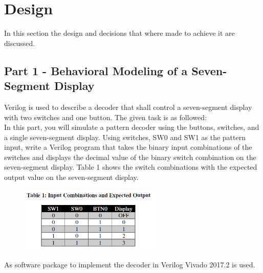 \section{Design}\label{sec: Design}
In this section the design and decisions that where made to achieve it are discussed.

\subsection{Part 1 - Behavioral Modeling of a Seven-Segment Display}\label{sub: Behavioral Modeling of a Seven-Segment Display}
Verilog is used to describe a decoder that shall control a seven-segment display with two switches and one button. The given task is as followed:
\\
In this part, you will simulate a pattern decoder using the buttons, switches, and a single seven-segment display.
Using switches, SW0 and SW1 as the pattern input, write a Verilog program that takes the binary input
combinations of the switches and displays the decimal value of the binary switch combination on the seven-segment
display. Table 1 shows the switch combinations with the expected output value on the seven-segment
display.

\begin{figure}[htbp]
	\centering
	\includegraphics[width=0.6\textwidth]{01_images/Vivado_lab2_part1_table1.png}
	\label{fig: Vivado_lab2_part1_table1}
\end{figure}

As software package to implement the decoder in Verilog Vivado 2017.2 is used. 

%

